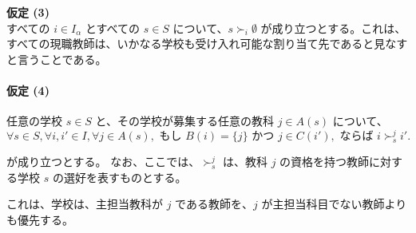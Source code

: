 \documentclass[12pt, a4paper]{article}
\theoremstyle{definition}
\theoremstyle{remark}
\theoremstyle{plain}
\begin{document}
\vspace{0.5\baselineskip}
\noindent\textbf{仮定 (3)} \\
すべての $i \in I_\alpha$ とすべての $s \in S$ について、$s \succ_i \emptyset$ が成り立つとする。これは、すべての現職教師は、いかなる学校も受け入れ可能な割り当て先であると見なすと言うことである。



\paragraph{\textbf{仮定 (4)}}
任意の学校 $s \in S$ と、その学校が募集する任意の教科 $j \in A(s)$ について、
\[
\forall s \in S, \forall i, i' \in I, \forall j \in A(s), \text{ もし } B(i) = \{j\} \text{ かつ } j \in C(i'), \text{ ならば } i \succ_{s}^j i'.
\]

が成り立つとする。
なお、ここでは、$\succ_s^j$ は、教科 $j$ の資格を持つ教師に対する学校 $s$ の選好を表すものとする。

これは、学校は、主担当教科が $j$ である教師を、$j$ が主担当科目でない教師よりも優先する。










\end{document}
